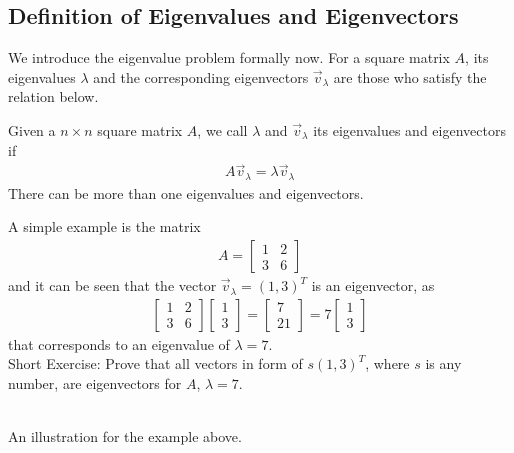 \subsection{Definition of Eigenvalues and Eigenvectors}
We introduce the eigenvalue problem formally now. For a square matrix $A$, its eigenvalues $\lambda$ and the corresponding eigenvectors $\vec{v}_\lambda$ are those who satisfy the relation below.
\begin{defn}
\label{eigen}
Given a $n \times n$ square matrix $A$, we call $\lambda$ and $\vec{v}_\lambda$ its eigenvalues and eigenvectors if
\begin{align*}
A\vec{v}_\lambda = \lambda\vec{v}_\lambda
\end{align*}
There can be more than one eigenvalues and eigenvectors.
\end{defn}
A simple example is the matrix
\begin{align*}
A =
\begin{bmatrix}
1 & 2 \\
3 & 6
\end{bmatrix}
\end{align*}
and it can be seen that the vector $\vec{v}_\lambda = (1,3)^T$ is an eigenvector, as
\begin{align*}
\begin{bmatrix}
1 & 2 \\
3 & 6
\end{bmatrix}
\begin{bmatrix}
1 \\
3 
\end{bmatrix}
=
\begin{bmatrix}
7 \\
21
\end{bmatrix}
=
7
\begin{bmatrix}
1 \\
3 
\end{bmatrix}
\end{align*}
that corresponds to an eigenvalue of $\lambda = 7$.\\
Short Exercise: Prove that all vectors in form of $s(1,3)^T$, where $s$ is any number, are eigenvectors for $A$, $\lambda = 7$.
\begin{center}
\\
An illustration for the example above.
\end{center}
